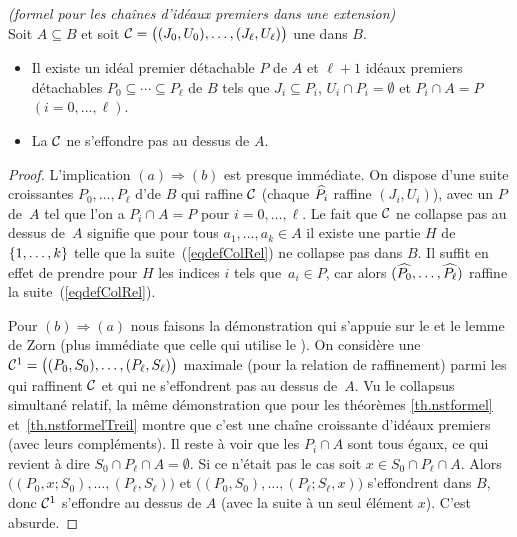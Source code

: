 \begin{theorem} 
\label{th.nstformelRel} {\em (\nst formel pour les chaînes d'idéaux 
premiers dans une extension)} 
 \Tcgi \\
Soit $A\subseteq 
B$  et soit ${\cal C}=\big((J_0,U_0),\ldots,(J_\ell,U_\ell)\big)$ une 
\proc dans $B$. \Propeq
\begin{itemize}
\item [$(a)$] Il existe un idéal premier détachable $P$ de $A$ et 
$\ell+1$ idéaux premiers détachables 
$P_0\subseteq \cdots\subseteq P_\ell$ de $B$ tels que
$J_i\subseteq P_i$, $U_i\cap P_i=\emptyset $ et $P_i\cap A=P$  
$(i=0,\ldots,\ell)$. 
\item [$(b)$] La \proc ${\cal C}$ ne s'effondre pas au dessus de $A$.
\end{itemize}
\end{theorem}
\begin{proof}
L'implication $(a)\Rightarrow (b)$ est presque immédiate. On dispose d'une suite croissantes $P_0,\dots,P_\ell$ d'\ideps de $B$ qui raffine ${\cal C}$ (chaque $\widehat{P_i}$ raffine $(J_i,U_i)$), avec un \idep $P$ de~$A$ tel que l'on a $P_i\cap A=P$ pour $i=0,\dots,\ell$.
Le fait que ${\cal C}$ ne collapse pas au dessus de~$A$ signifie que pour tous $a_1,\dots,a_k\in A$ il existe une partie $H$ de $\{1,\dots,k\}$ telle que
la suite~(\ref{eqdefColRel}) ne collapse pas dans $B$. Il suffit en effet de prendre pour $H$ les indices $i$ tels \hbox{que $a_i\in P$}, car alors $(\widehat{P_0},\dots,\widehat{P_\ell})$
raffine la suite~(\ref{eqdefColRel}). 

\noindent Pour $(b)\Rightarrow (a)$ nous 
faisons la démonstration qui s'appuie sur le \pte et le lemme de 
Zorn (plus immédiate que celle qui utilise le \tcg). On considère une \proc 
${\cal C}^1=\big((P_0,S_0),\ldots,(P_\ell,S_\ell)\big)$ 
maximale (pour la relation de raffinement) parmi les \procs qui raffinent 
${\cal C}$ et qui ne s'effondrent pas au dessus de~$A$. Vu le collapsus 
simultané relatif, la même démonstration que pour les théorèmes 
\ref{th.nstformel} \hbox{et \ref{th.nstformelTreil}} montre que c'est une chaîne croissante d'idéaux 
premiers (avec leurs compléments). 
Il reste à voir que les $P_i\cap A$  sont tous égaux, ce qui revient 
à dire $S_0\cap P_\ell\cap A=\emptyset$. 
Si ce n'était pas le cas soit $x\in S_0\cap P_\ell\cap A$.   
Alors $\big((P_0,x;S_0),\ldots,(P_\ell,S_\ell)\big)$ et 
$\big((P_0,S_0),\ldots,(P_\ell;S_\ell,x)\big)$ s'effondrent dans $B$, 
donc ${\cal C}^1$ s'effondre au dessus de $A$  (avec la suite à un seul élément $x$). 
C'est absurde.
\end{proof}

